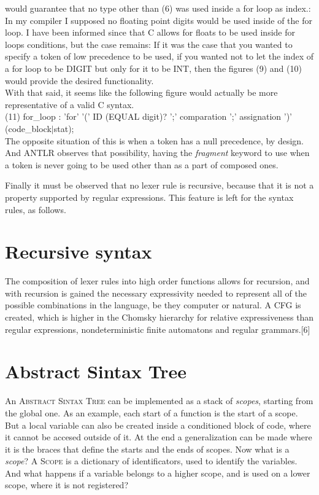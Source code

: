 \documentclass[twocolumn,10ptr]{article}
\begin{document}
	would guarantee that no type other than (6) was used inside a for loop as index.:\\
	
	In my compiler I supposed no floating point digits would be used inside of the for loop. I have been informed since that C allows for floats to be used inside for loops conditions, but the case remains:
	If it was the case that you wanted to specify a token of low precedence to be used, if you wanted not to let the index of a for loop to be DIGIT but only for it to be INT, then the figures (9) and (10) would provide the desired functionality.\\
	
	With that said, it seems like the following figure would actually be more representative of a valid C syntax.\\
	
	(11) for\_loop :  'for' '(' ID (EQUAL digit)? ';' comparation ';' assignation ')' (code\_block\(\mid\)stat);\\
	
	The opposite situation of this is when a token has a null precedence, by design. And ANTLR observes that possibility, having the \textit{fragment} keyword to use when a token is never going to be used other than as a part of composed ones.
	
	Finally it must be observed that no lexer rule is recursive, because that it is not a property supported by regular expressions. This feature is left for the syntax rules, as follows.
	
	\section{Recursive syntax}
	The composition of lexer rules into high order functions allows for recursion, and with recursion is gained the necessary expressivity needed to represent all of the possible combinations  in the language, be they computer or natural. A CFG is created, which is higher in the Chomsky hierarchy for relative expressiveness than regular expressions, nondeterministic finite automatons and regular grammars.[6] 
	
	\section{ Abstract Sintax Tree}
	An \textsc{Abstract Sintax Tree} can be implemented as a stack of\textit{ scopes}, starting from the global one. As an example, each start of a function is the start of a scope. But a local variable can also be created inside a conditioned block of code, where it cannot be accesed outside of it. At the end a generalization can be made where it is the braces that define the starts and the ends of scopes.
	Now what is a\textit{ scope}? A\textsc{ Scope} is a dictionary of identificators, used to identify the variables.
	And what happens if a variable belongs to a higher scope, and is used on a lower scope, where it is not registered? 
	
\end{document}
